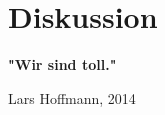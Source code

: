\section{Diskussion}
\label{sec:Diskussion}
\begin{center}
	\textbf{"Wir sind toll."}
\end{center}
\begin{flushright}
	Lars Hoffmann, 2014
\end{flushright}
\Huge{\Smiley{}}
